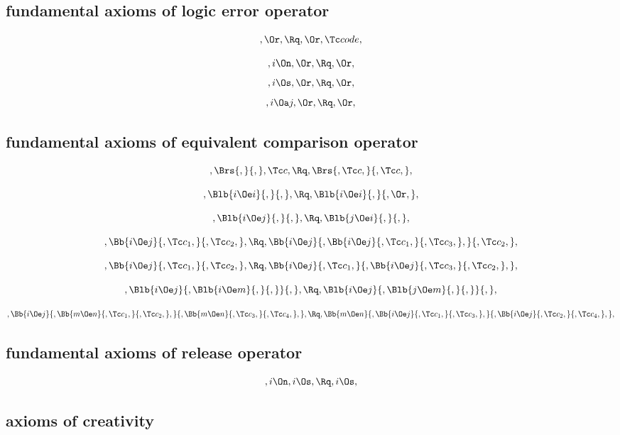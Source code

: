 \bigskip
\subsection{fundamental axioms of logic error operator}

\[,\Or, \Rq ,\Or, \Tc code,\]


\[,i \On, \Or, \Rq ,\Or,\]
\[,i \Os, \Or, \Rq ,\Or,\]
\[,i \Oa j, \Or, \Rq ,\Or,\]



\bigskip
\subsection{ fundamental axioms of equivalent comparison operator}

\[,\Brs{,}{,} ,\Tc c, \Rq, \Brs{,\Tc c,}{,\Tc c,},\]

\bigskip

\[, \Blb{i \Oe i}{,}{,}, \Rq , \Blb{i \Oe i}{,}{, \Or,},\]


\bigskip

\[, \Blb{i \Oe j}{,}{,}, \Rq , \Blb{j \Oe i}{,}{,},\]


\bigskip

\[, \Bb{i \Oe j}{,\Tc c_1,}{,\Tc c_2,}, \Rq , \Bb{i \Oe j}{, \Bb{i \Oe j}{,\Tc c_1,}{,\Tc c_3,},}{,\Tc c_2,} ,\]

\bigskip

\[, \Bb{i \Oe j}{,\Tc c_1,}{,\Tc c_2,}, \Rq , \Bb{i \Oe j}{, \Tc c_1,}{,\Bb{i \Oe j}{,\Tc c_3,}{,\Tc c_2,},} ,\]


\bigskip

\[, \Blb{i \Oe j}{,\Blb{i \Oe m}{,}{,}}{,}, \Rq , \Blb{i \Oe j}{, \Blb{j \Oe m}{,}{,}}{,}, \]


\bigskip
\[, \Bb{i \Oe j}{,\Bb{m \Oe n}{,\Tc c_1,}{,\Tc c_2,},}{, \Bb{m \Oe n}{,\Tc c_3,}{,\Tc c_4,},}, \Rq ,  \Bb{m \Oe n}{,\Bb{i \Oe j}{,\Tc c_1,}{,\Tc c_3,},}{, \Bb{i \Oe j}{,\Tc c_2,}{,\Tc c_4,},},\]


\bigskip
\subsection{fundamental axioms of release operator}

\[,i \On ,i \Os , \Rq ,i \Os,\]



\bigskip
\subsection{axioms of creativity}

